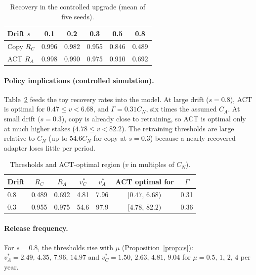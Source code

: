 \documentclass[acmsmall,review]{acmart}
\begin{document}
\begin{table}[t]
\centering
\caption{Recovery in the controlled upgrade (mean of five seeds).}\label{tab:toy}
\begin{tabular}{lccccc}
\toprule
Drift $s$ & 0.1 & 0.2 & 0.3 & 0.5 & 0.8\\
\midrule
Copy $R_C$ & 0.996 & 0.982 & 0.955 & 0.846 & 0.489\\
ACT $R_A$ & 0.998 & 0.990 & 0.975 & 0.910 & 0.692\\
\bottomrule
\end{tabular}
\end{table}

\paragraph{Policy implications (controlled simulation).} Table~\ref{tab:policy} feeds the toy recovery rates into the model. At large drift
($s=0.8$), ACT is optimal for $0.47\le v<6.68$, and $\Gamma=0.31C_N$, six times the assumed $C_A$. At small drift
($s=0.3$), copy is already close to retraining, so ACT is optimal only at much higher stakes ($4.78\le v<82.2$).
The retraining thresholds are large relative to $C_N$ (up to $54.6C_N$ for copy at $s=0.3$) because a nearly
recovered adapter loses little per period.

\begin{table}[t]
\centering
\caption{Thresholds and ACT-optimal region ($v$ in multiples of $C_N$).}\label{tab:policy}
\begin{tabular}{lcccccc}
\toprule
Drift & $R_C$ & $R_A$ & $v^*_C$ & $v^*_A$ & ACT optimal for & $\Gamma$\\
\midrule
0.8 & 0.489 & 0.692 & 4.81 & 7.96 & $[0.47,\,6.68)$ & 0.31\\
0.3 & 0.955 & 0.975 & 54.6 & 97.9 & $[4.78,\,82.2)$ & 0.36\\
\bottomrule
\end{tabular}
\end{table}

\paragraph{Release frequency.} For $s=0.8$, the thresholds rise with $\mu$ (Proposition~\ref{prop:cs}):
$v^*_A=2.49,\,4.35,\,7.96,\,14.97$ and $v^*_C=1.50,\,2.63,\,4.81,\,9.04$ for $\mu=0.5,\,1,\,2,\,4$ per year.
\end{document}
